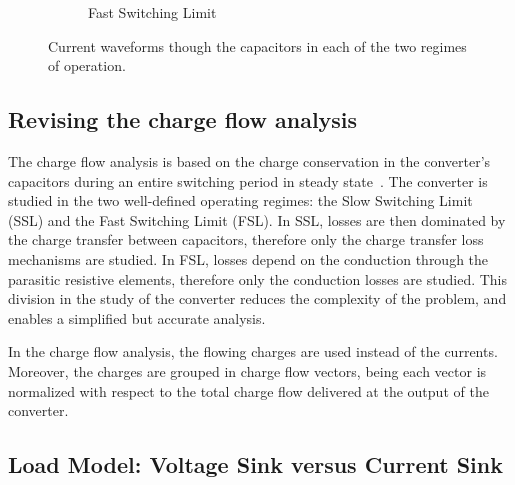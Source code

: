 \begin{figure}[!h]
\begin{subfigure}[t]{.45\textwidth}
    \caption{Fast Switching Limit}
    \label{fig:ic_fsl}
\end{subfigure}
\caption{Current waveforms though the capacitors in each of the two regimes of operation. }
\label{fig:capacitor_current}
\end{figure}


\subsection{Revising the charge flow analysis}

The charge flow analysis is based on the charge conservation in the converter's capacitors during an entire switching period in steady state~\cite{95Makowski}. The converter is studied in the two well-defined operating regimes: the Slow Switching Limit (SSL) and the Fast Switching Limit (FSL). In SSL, losses are then dominated by the charge transfer between capacitors, therefore only the charge transfer loss mechanisms are studied.  In FSL, losses depend on the conduction through the parasitic resistive elements, therefore only the conduction losses are studied. This division in the study of the converter reduces the complexity of the problem, and enables a simplified but accurate analysis.

In the charge flow analysis, the flowing charges are used instead of the currents. Moreover, the charges are grouped in charge flow vectors, being each vector is normalized with respect to the total charge flow delivered at the output of the converter.


\subsection{Load Model: Voltage Sink versus Current Sink}

